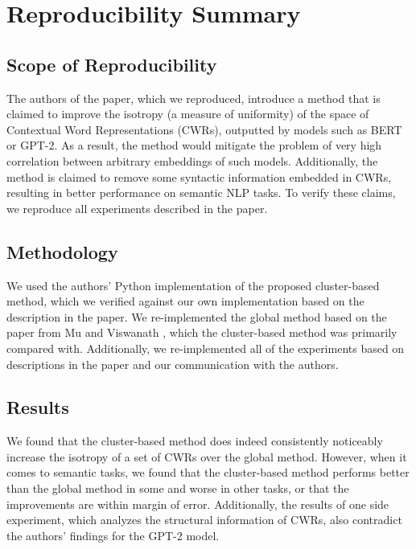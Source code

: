 \section{Reproducibility Summary}


\subsection*{Scope of Reproducibility}

The authors of the paper, which we reproduced, introduce a method that is claimed to improve the isotropy (a measure of uniformity) of the space of Contextual Word Representations (CWRs), outputted by models such as BERT or GPT-2. As a result, the method would mitigate the problem of very high correlation between arbitrary embeddings of such models. Additionally, the method is claimed to remove some syntactic information embedded in CWRs, resulting in better performance on semantic NLP tasks. To verify these claims, we reproduce all  experiments described in the paper.

\subsection*{Methodology}
We used the authors' Python implementation  of the proposed cluster-based method, which we verified against our own implementation based on the description in the paper. We re-implemented the global method based on the paper from Mu and Viswanath \cite{global}, which the cluster-based method was primarily compared with. Additionally, we re-implemented all of the experiments based on descriptions in the paper and our communication with the authors. 

\subsection*{Results}

We found that the cluster-based method does indeed consistently noticeably increase the isotropy of a set of CWRs over the global method. However, when it comes to semantic tasks, we found that the cluster-based method performs better than the global method in some and worse in other tasks, or that the improvements are within margin of error. Additionally, the results of one side experiment, which analyzes the structural information of CWRs, also contradict the authors' findings for the GPT-2 model. 

